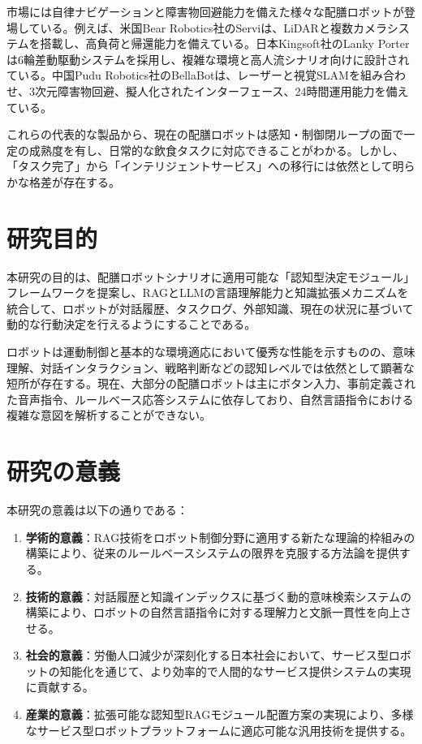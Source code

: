 \documentclass[12pt]{report}
\begin{document}
市場には自律ナビゲーションと障害物回避能力を備えた様々な配膳ロボットが登場している。例えば、米国Bear Robotics社のServiは、LiDARと複数カメラシステムを搭載し、高負荷と帰還能力を備えている。日本Kingsoft社のLanky Porterは6輪差動駆動システムを採用し、複雑な環境と高人流シナリオ向けに設計されている。中国Pudu Robotics社のBellaBotは、レーザーと視覚SLAMを組み合わせ、3次元障害物回避、擬人化されたインターフェース、24時間運用能力を備えている。

これらの代表的な製品から、現在の配膳ロボットは感知・制御閉ループの面で一定の成熟度を有し、日常的な飲食タスクに対応できることがわかる。しかし、「タスク完了」から「インテリジェントサービス」への移行には依然として明らかな格差が存在する。

\section{研究目的}
\label{sec:purpose}

本研究の目的は、配膳ロボットシナリオに適用可能な「認知型決定モジュール」フレームワークを提案し、RAGとLLMの言語理解能力と知識拡張メカニズムを統合して、ロボットが対話履歴、タスクログ、外部知識、現在の状況に基づいて動的な行動決定を行えるようにすることである。

ロボットは運動制御と基本的な環境適応において優秀な性能を示すものの、意味理解、対話インタラクション、戦略判断などの認知レベルでは依然として顕著な短所が存在する。現在、大部分の配膳ロボットは主にボタン入力、事前定義された音声指令、ルールベース応答システムに依存しており、自然言語指令における複雑な意図を解析することができない。

\section{研究の意義}
\label{sec:significance}

本研究の意義は以下の通りである：

\begin{enumerate}
  \item \textbf{学術的意義}：RAG技術をロボット制御分野に適用する新たな理論的枠組みの構築により、従来のルールベースシステムの限界を克服する方法論を提供する。
  \item \textbf{技術的意義}：対話履歴と知識インデックスに基づく動的意味検索システムの構築により、ロボットの自然言語指令に対する理解力と文脈一貫性を向上させる。
  \item \textbf{社会的意義}：労働人口減少が深刻化する日本社会において、サービス型ロボットの知能化を通じて、より効率的で人間的なサービス提供システムの実現に貢献する。
  \item \textbf{産業的意義}：拡張可能な認知型RAGモジュール配置方案の実現により、多様なサービス型ロボットプラットフォームに適応可能な汎用技術を提供する。
\end{enumerate}
\end{document}

